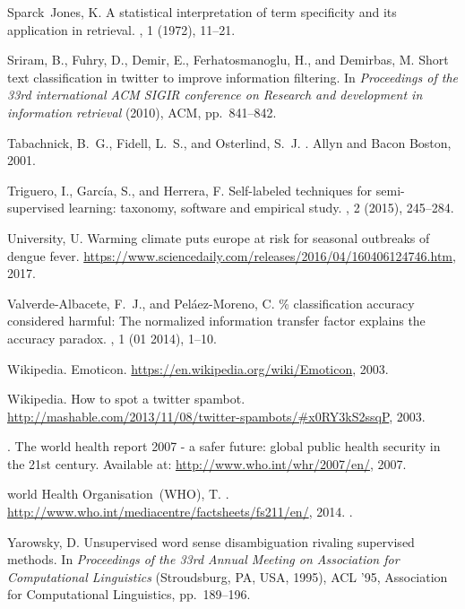 \documentclass[10pt,letterpaper]{article}
\begin{document}
\begin{thebibliography}{10}
{\sc Sparck~Jones, K.}
\newblock A statistical interpretation of term specificity and its application
  in retrieval.
, 1 (1972), 11--21.

{\sc Sriram, B., Fuhry, D., Demir, E., Ferhatosmanoglu, H., and Demirbas, M.}
\newblock Short text classification in twitter to improve information
  filtering.
\newblock In {\em Proceedings of the 33rd international ACM SIGIR conference on
  Research and development in information retrieval\/} (2010), ACM,
  pp.~841--842.

{\sc Tabachnick, B.~G., Fidell, L.~S., and Osterlind, S.~J.}
.
\newblock Allyn and Bacon Boston, 2001.

{\sc Triguero, I., Garc{\'i}a, S., and Herrera, F.}
\newblock Self-labeled techniques for semi-supervised learning: taxonomy,
  software and empirical study.
, 2 (2015), 245--284.

{\sc University, U.}
\newblock Warming climate puts europe at risk for seasonal outbreaks of dengue
  fever.
\newblock \url{https://www.sciencedaily.com/releases/2016/04/160406124746.htm},
  2017.

{\sc Valverde-Albacete, F.~J., and Pel\'{a}ez-Moreno, C.}
\% classification accuracy considered harmful: The normalized
  information transfer factor explains the accuracy paradox.
, 1 (01 2014), 1--10.

{\sc Wikipedia}.
\newblock Emoticon.
\newblock \url{https://en.wikipedia.org/wiki/Emoticon}, 2003.

{\sc Wikipedia}.
\newblock How to spot a twitter spambot.
\newblock \url{http://mashable.com/2013/11/08/twitter-spambots/#x0RY3kS2ssqP},
  2003.

{}.
\newblock The world health report 2007 - a safer future: global public health
  security in the 21st century.
\newblock Available at: \url{http://www.who.int/whr/2007/en/}, 2007.

{\sc world Health Organisation~{(WHO)}, T.}
.
\newblock \url{http://www.who.int/mediacentre/factsheets/fs211/en/}, 2014.
.

{\sc Yarowsky, D.}
\newblock Unsupervised word sense disambiguation rivaling supervised methods.
\newblock In {\em Proceedings of the 33rd Annual Meeting on Association for
  Computational Linguistics\/} (Stroudsburg, PA, USA, 1995), ACL '95,
  Association for Computational Linguistics, pp.~189--196.


\end{thebibliography}
\end{document}
